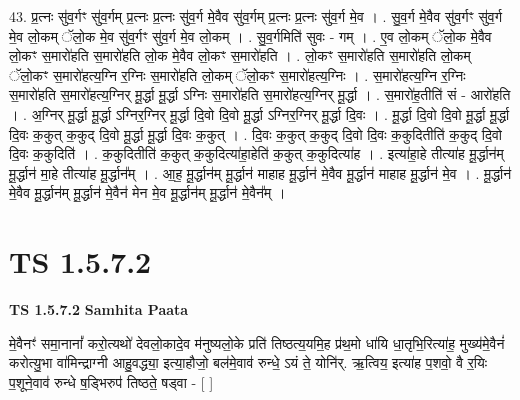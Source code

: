 \documentclass[17pt]{extarticle}
\begin{document}
43. प्र॒त्नः सु॑व॒र्गꣳ सु॑व॒र्गम् प्र॒त्नः प्र॒त्नः सु॑व॒र्ग मे॒वैव सु॑व॒र्गम् प्र॒त्नः प्र॒त्नः सु॑व॒र्ग मे॒व । . सु॒व॒र्ग मे॒वैव सु॑व॒र्गꣳ सु॑व॒र्ग मे॒व लो॒कम् ॅलो॒क मे॒व सु॑व॒र्गꣳ सु॑व॒र्ग मे॒व लो॒कम् । . सु॒व॒र्गमिति॑ सुवः - गम् । . ए॒व लो॒कम् ॅलो॒क मे॒वैव लो॒कꣳ स॒मारो॑हति स॒मारो॑हति लो॒क मे॒वैव लो॒कꣳ स॒मारो॑हति । . लो॒कꣳ स॒मारो॑हति स॒मारो॑हति लो॒कम् ॅलो॒कꣳ स॒मारो॑हत्य॒ग्नि र॒ग्निः स॒मारो॑हति लो॒कम् ॅलो॒कꣳ स॒मारो॑हत्य॒ग्निः । . स॒मारो॑हत्य॒ग्नि र॒ग्निः स॒मारो॑हति स॒मारो॑हत्य॒ग्निर् मू॒र्द्धा मू॒र्द्धा ऽग्निः स॒मारो॑हति स॒मारो॑हत्य॒ग्निर् मू॒र्द्धा । . स॒मारो॑ह॒तीति॑ सं - आरो॑हति । . अ॒ग्निर् मू॒र्द्धा मू॒र्द्धा ऽग्निर॒ग्निर् मू॒र्द्धा दि॒वो दि॒वो मू॒र्द्धा ऽग्निर॒ग्निर् मू॒र्द्धा दि॒वः । . मू॒र्द्धा दि॒वो दि॒वो मू॒र्द्धा मू॒र्द्धा दि॒वः क॒कुत् क॒कुद् दि॒वो मू॒र्द्धा मू॒र्द्धा दि॒वः क॒कुत् । . दि॒वः क॒कुत् क॒कुद् दि॒वो दि॒वः क॒कुदितीति॑ क॒कुद् दि॒वो दि॒वः क॒कुदिति॑ । . क॒कुदितीति॑ क॒कुत् क॒कुदित्या॑हा॒हेति॑ क॒कुत् क॒कुदित्या॑ह । . इत्या॑हा॒हे तीत्या॑ह मू॒र्द्धान॑म् मू॒र्द्धान॑ मा॒हे तीत्या॑ह मू॒र्द्धान᳚म् । . आ॒ह॒ मू॒र्द्धान॑म् मू॒र्द्धान॑ माहाह मू॒र्द्धान॑ मे॒वैव मू॒र्द्धान॑ माहाह मू॒र्द्धान॑ मे॒व । . मू॒र्द्धान॑ मे॒वैव मू॒र्द्धान॑म् मू॒र्द्धान॑ मे॒वैन॑ मेन मे॒व मू॒र्द्धान॑म् मू॒र्द्धान॑ मे॒वैन᳚म् । \newline
\pagebreak
{}

\section{ TS 1.5.7.2 }

\textbf{TS 1.5.7.2 } \newline
\textbf{Samhita Paata} \newline

मे॒वैनꣳ॑ समा॒नानां᳚ करो॒त्यथो॑ देवलो॒कादे॒व म॑नुष्यलो॒के प्रति॑ तिष्ठत्य॒यमि॒ह प्र॑थ॒मो धा॑यि धा॒तृभि॒रित्या॑ह॒ मुख्य॑मे॒वैनं॑ करोत्यु॒भा वा॑मिन्द्राग्नी आहु॒वद्ध्या॒ इत्या॒हौजो॒ बल॑मे॒वाव॑ रुन्धे॒ ऽयं ते॒ योनि॑र्. ऋ॒त्विय॒ इत्या॑ह प॒शवो॒ वै र॒यिः प॒शूने॒वाव॑ रुन्धे ष॒ड्भिरुप॑ तिष्ठते॒ षड्वा - [ ] \newline
\end{document}
